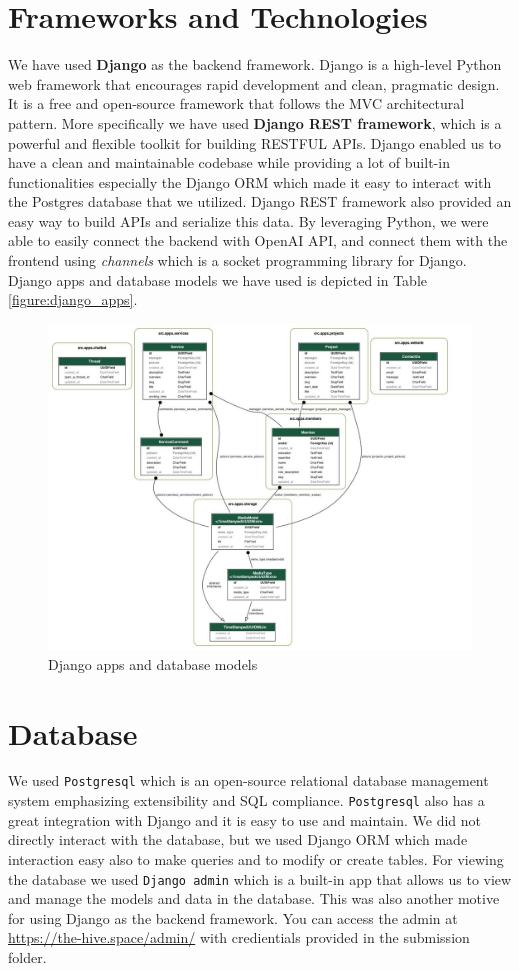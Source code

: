 \section{Frameworks and Technologies}
We have used \textbf{Django} as the backend framework.
Django is a high-level Python web framework that encourages rapid development and clean, pragmatic design.
It is a free and open-source framework that follows the MVC architectural pattern.
More specifically we have used \textbf{Django REST framework}, which is a powerful and flexible toolkit for building RESTFUL APIs.
Django enabled us to have a clean and maintainable codebase while providing a lot of built-in functionalities especially the Django ORM which made it easy to interact with the Postgres database that we utilized. Django REST framework also provided  an easy way to build APIs and serialize this data.
By leveraging Python, we were able to easily connect the backend with OpenAI API, and connect them with the frontend using \textit{channels} which is a socket programming library for Django.
Django apps and database models we have used is depicted in Table \ref{figure:django_apps}.

\begin{figure}[htbp]
    \centering
    \includegraphics[width=0.7\linewidth]{img/django.jpeg}
    \caption{Django apps and database models}
    \label{fig:django_apps}
\end{figure}

\section{Database}
We used \texttt{Postgresql} which is an open-source relational database management system emphasizing extensibility and SQL compliance.
\texttt{Postgresql} also has a great integration with Django and it is easy to use and maintain.
We did not directly interact with the database, but we used Django ORM which made interaction easy also to make queries and to modify or create tables.
For viewing the database we used \texttt{Django admin} which is a built-in app that allows us to view and manage the models and data in the database.
This was also another motive for using Django as the backend framework.
You can access the admin at \url{https://the-hive.space/admin/} with credientials provided in the submission folder.
